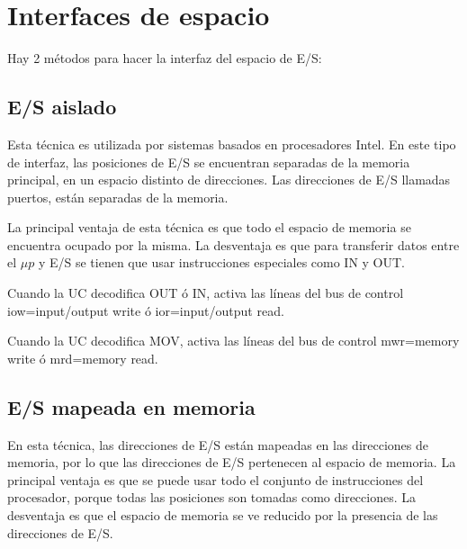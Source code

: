 \section{Interfaces de espacio}

Hay 2 métodos para hacer la interfaz del espacio de E/S:\@

\subsection*{E/S aislado}

Esta técnica es utilizada por sistemas basados en procesadores Intel. En este tipo de interfaz, las posiciones de E/S se encuentran separadas de la memoria principal, en un espacio distinto de direcciones. Las direcciones de E/S llamadas puertos, están separadas de la memoria.

La principal ventaja de esta técnica es que todo el espacio de memoria se encuentra ocupado por la misma. La desventaja es que para transferir datos entre el $\mu p$ y E/S se tienen que usar instrucciones especiales como IN y OUT.\@

Cuando la UC decodifica OUT ó IN, activa las líneas del bus de control iow=input/output write ó ior=input/output read.

Cuando la UC decodifica MOV, activa las líneas del bus de control mwr=memory write ó mrd=memory read.

\subsection*{E/S mapeada en memoria}

En esta técnica, las direcciones de E/S están mapeadas en las direcciones de memoria, por lo que las direcciones de E/S pertenecen al espacio de memoria. La principal ventaja es que se puede usar todo el conjunto de instrucciones del procesador, porque todas las posiciones son tomadas como direcciones. La desventaja es que el espacio de memoria se ve reducido por la presencia de las direcciones de E/S.
